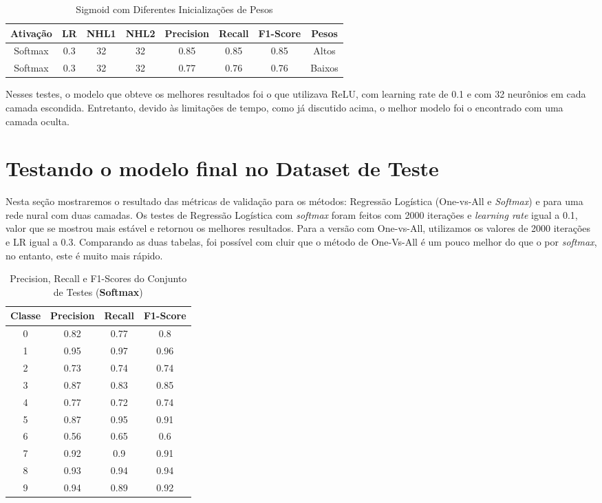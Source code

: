 \documentclass[conference]{IEEEtran}
\begin{document}
\begin{table}[h!]
 \begin{center}
  \caption{Sigmoid com Diferentes Inicializações de Pesos}
  \label{table:table3}
  \begin{tabular}{ |c|c|c|c|c|c|c|c| }
   \hline
   Ativação & LR & NHL1 & NHL2 & Precision & Recall & F1-Score & Pesos\\
   \hline
   Softmax & 0.3 & 32 & 32 & 0.85 & 0.85 & 0.85 & Altos \\
   Softmax & 0.3 & 32 & 32 & 0.77 & 0.76 & 0.76 & Baixos \\
   \hline
 \end{tabular}
 \end{center}
\end{table}

	Nesses testes, o modelo que obteve os melhores resultados foi o que utilizava ReLU, com learning rate de 0.1 e com 32 neurônios em cada camada escondida. Entretanto, devido às limitações de tempo, como já discutido acima, o melhor modelo foi o encontrado com uma camada oculta.
	
\newpage
\section{Testando o modelo final no Dataset de Teste}

Nesta seção mostraremos o resultado das métricas de validação para os métodos: Regressão Logística (One-vs-All e \textit{Softmax}) e para uma rede nural com duas camadas. Os testes de Regressão Logística com \textit{softmax} foram feitos com 2000 iterações e \textit{learning rate} igual a 0.1, valor que se mostrou mais estável e retornou os melhores resultados. Para a versão com One-vs-All, utilizamos os valores de 2000 iterações e LR igual a 0.3. Comparando as duas tabelas, foi possível com cluir que o método de One-Vs-All é um pouco melhor do que o por \textit{softmax}, no entanto, este é muito mais rápido.

\begin{table}[h!]
 \begin{center}
  \caption{Precision, Recall e F1-Scores do Conjunto de Testes (\textbf{Softmax})}
  \label{table:table3}
  \begin{tabular}{ |c|c|c|c| }
   \hline
   Classe & Precision & Recall & F1-Score\\
   \hline
   0 & 0.82 & 0.77 & 0.8 \\
   1 & 0.95 & 0.97 & 0.96 \\
   2 & 0.73 & 0.74 & 0.74 \\
   3 & 0.87 & 0.83 & 0.85 \\
   4 & 0.77 & 0.72 & 0.74 \\
   5 & 0.87 & 0.95 & 0.91 \\
   6 & 0.56 & 0.65 & 0.6 \\
   7 & 0.92 & 0.9 & 0.91 \\
   8 & 0.93 & 0.94 & 0.94 \\
   9 & 0.94 & 0.89 & 0.92 \\
   \hline
 \end{tabular}
 \end{center}
\end{table}
\end{document}
